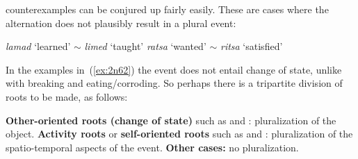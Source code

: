 \begin{exe}
\begin{xlist}
\begin{exe}
\begin{xlist}
\begin{exe}
\begin{xlist}
\begin{exe}
\begin{exe}
\begin{xlist}
\begin{exe}
\begin{xlist}
\begin{exe}
\begin{xlist}
\begin{exe}
\begin{xlist}
\begin{exe}
\begin{xlist}
\begin{exe}
\begin{xlist}
\begin{exe}
\begin{xlist}
\begin{exe}
\begin{xlist}
\begin{exe}
\begin{xlist}
\begin{exe}
\begin{xlist}
\begin{exe}
\begin{xlist}
\begin{exe}
\begin{xlist}
\begin{exe}
\begin{exe}
\begin{xlist}
\begin{exe}
\begin{xlist}
\begin{exe}
\begin{xlist}
\begin{exe}
\begin{xlist}
{\begin{exe}
\begin{xlist}
\begin{exe}
\begin{xlist}
\begin{exe}
\begin{xlist}
\begin{exe}
\begin{xlist}
\begin{xlist}
\begin{xlist}
\begin{exe}
\begin{xlist}
\begin{xlist}
\begin{xlist}
\begin{exe}
\begin{exe}
\begin{xlist}
\begin{exe}
\begin{xlist}
\begin{exe}
\begin{xlist}
\begin{exe}
\begin{xlist}
\begin{exe}
\begin{xlist}
\begin{exe}
\begin{xlist}
\begin{exe}
\begin{exe}
\begin{xlist}
\begin{xlist}
\begin{exe}
\begin{xlist}
\begin{exe}
\begin{xlist}
\begin{exe}
\begin{xlist}
\begin{exe}
\begin{xlist}
\begin{exe}
\begin{xlist}
\begin{exe}
\begin{xlist}
\begin{exe}
\begin{exe}
\begin{xlist}
\begin{exe}
\begin{xlist}
\begin{exe}
\begin{xlist}
\begin{exe}
\begin{xlist}
counterexamples can be conjured up fairly easily. These are cases where the alternation does not plausibly result in a plural event:
 \begin{exe}
 \ex  \label{ex:2n62}
 \begin{xlist} 
 	\ex  \emph{lamad} `learned' $\sim$ \emph{limed} `taught' 
 	\ex   \emph{ratsa} `wanted' $\sim$ \emph{ritsa} `satisfied' 
 \z
\z 

In the examples in~(\ref{ex:2n62}) the event does not entail change of state, unlike with breaking and eating/corroding. So perhaps there is a tripartite division of roots to be made, as follows:
 \begin{exe}
 \ex  \label{ex:2n63}
 \begin{xlist} 
 	\ex   \textbf{Other-oriented roots (change of state)} such as  and : pluralization of the object. 
 	\ex   \textbf{Activity roots} or \textbf{self-oriented roots} such as  and : pluralization of the spatio-temporal aspects of the event. 
 	\ex  \textbf{Other cases:} no pluralization. 
 \z

\end{xlist}
\end{exe}
\end{xlist}
\end{exe}
\end{xlist}
\end{exe}
\end{xlist}
\end{exe}
\end{xlist}
\end{exe}
\end{xlist}
\end{exe}
\end{exe}
\end{xlist}
\end{exe}
\end{xlist}
\end{exe}
\end{xlist}
\end{exe}
\end{xlist}
\end{exe}
\end{xlist}
\end{exe}
\end{xlist}
\end{exe}
\end{xlist}
\end{xlist}
\end{exe}
\end{exe}
\end{xlist}
\end{exe}
\end{xlist}
\end{exe}
\end{xlist}
\end{exe}
\end{xlist}
\end{exe}
\end{xlist}
\end{exe}
\end{xlist}
\end{exe}
\end{exe}
\end{xlist}
\end{xlist}
\end{xlist}
\end{exe}
\end{xlist}
\end{xlist}
\end{xlist}
\end{exe}
\end{xlist}
\end{exe}
\end{xlist}
\end{exe}
\end{xlist}
\end{exe}}
\end{xlist}
\end{exe}
\end{xlist}
\end{exe}
\end{xlist}
\end{exe}
\end{xlist}
\end{exe}
\end{exe}
\end{xlist}
\end{exe}
\end{xlist}
\end{exe}
\end{xlist}
\end{exe}
\end{xlist}
\end{exe}
\end{xlist}
\end{exe}
\end{xlist}
\end{exe}
\end{xlist}
\end{exe}
\end{xlist}
\end{exe}
\end{xlist}
\end{exe}
\end{xlist}
\end{exe}
\end{xlist}
\end{exe}
\end{xlist}
\end{exe}
\end{exe}
\end{xlist}
\end{exe}
\end{xlist}
\end{exe}
\end{xlist}
\end{exe}
